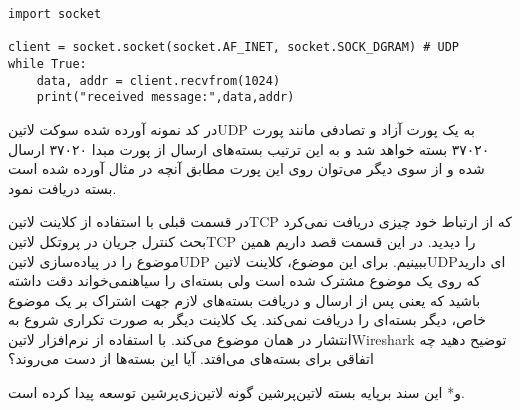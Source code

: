 \documentclass[]{article}
\begin{document}
  \begin{latin}
  \begin{verbatim}
import socket

client = socket.socket(socket.AF_INET, socket.SOCK_DGRAM) # UDP
while True:
    data, addr = client.recvfrom(1024)
    print("received message:",data,addr)
  \end{verbatim}
  \end{latin}

  در کد نمونه آورده شده سوکت ‌لاتین{UDP} به یک پورت آزاد و تصادفی مانند پورت ۳۷۰۲۰ بسته خواهد شد و به این ترتیب بسته‌های ارسال از پورت مبدا ۳۷۰۲۰ ارسال شده
  و از سوی دیگر می‌توان روی این پورت مطابق آنچه در مثال آورده شده است بسته دریافت نمود.


  در قسمت قبلی با استفاده از کلاینت ‌لاتین{TCP} که از ارتباط خود چیزی دریافت نمی‌کرد بحث کنترل جریان
  در پروتکل ‌لاتین{TCP} را دیدید. در این قسمت قصد داریم همین موضوع را در پیاده‌سازی ‌لاتین{UDP} ببینیم.
  برای این موضوع، کلاینت ‌لاتین{UDP}ای دارید که روی یک موضوع مشترک شده است ولی بسته‌ای را ‌سیاه{نمی‌خواند}
  دقت داشته باشید که یعنی پس از ارسال و دریافت بسته‌های لازم جهت اشتراک بر یک موضوع خاص، دیگر بسته‌ای را دریافت نمی‌کند.
  یک کلاینت دیگر به صورت تکراری شروع به انتشار در همان موضوع می‌کند.
  با استفاده از نرم‌افزار ‌لاتین{Wireshark} توضیح دهید چه اتفاقی برای بسته‌های می‌افتد. آیا این بسته‌ها از دست می‌روند؟

  ‌و*{}
این سند برپایه بسته ‌لاتین{‌پرشین} گونه ‌لاتین{‌زی‌پرشین} توسعه پیدا کرده است.
\end{document}
